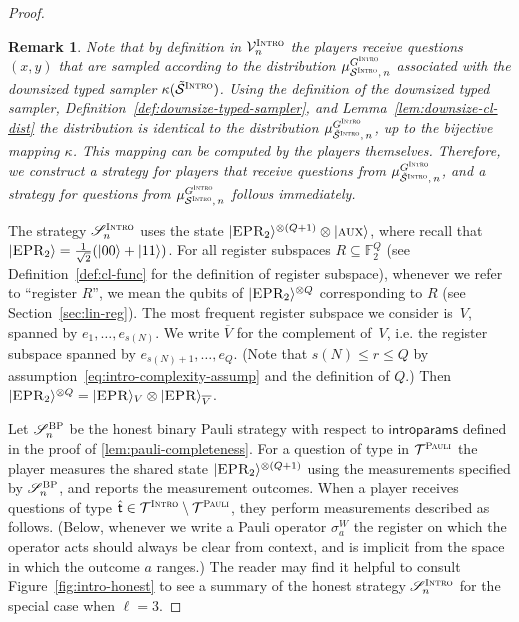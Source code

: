 \documentclass[11pt]{article}
\newtheorem{remark}[theorem]{Remark}
\theoremstyle{definition}
\newcommand{\ket}[1]{|#1\rangle}
\newcommand{\F}{\ensuremath{\mathbb{F}}}
\newcommand{\downsize}{\kappa}
\newcommand{\sampler}{\mathcal{S}}
\newcommand{\verifier}{\mathcal{V}}
\newcommand{\strategy}{\mathscr{S}}
\newcommand{\type}{\mathcal{T}}
\newcommand{\gamestyle}[1]{\ensuremath{\textsc{#1}}\xspace}
\newcommand{\pauli}{\gamestyle{Pauli}}
\newcommand{\bp}{\gamestyle{BP}}
\newcommand{\intro}{\gamestyle{Intro}}
\newcommand{\labelstyle}[1]{\ensuremath{\textsc{#1}}\xspace}
\newcommand{\EPR}{\labelstyle{EPR}}
\newcommand{\aux}{\labelstyle{aux}}
\newcommand{\tvarstyle}[1]{\mathsf{#1}}
\newcommand{\tvar}{\ensuremath{\tvarstyle{t}}}
\newcommand{\introparams}{\mathsf{introparams}}
\begin{document}
\begin{proof}
  \begin{remark}
    \label{rk:downsizing}
    Note that by definition in $\verifier_n^\intro$ the players receive
    questions $(x,y)$ that are sampled according to the distribution
    $\mu_{\sampler^\intro,\, n}^{G^\intro}$ associated with the downsized typed
    sampler $\downsize(\tilde{\sampler}^\intro)$.
    Using the definition of the downsized typed sampler,
    Definition~\ref{def:downsize-typed-sampler}, and
    Lemma~\ref{lem:downsize-cl-dist} the distribution is identical to the
    distribution $\mu_{\tilde{\sampler}^\intro,\, n}^{G^\intro}$, up to the
    bijective mapping $\downsize$.
    This mapping can be computed by the players themselves.
    Therefore, we construct a strategy for players that receive questions from
    $\mu_{\tilde{\sampler}^\intro,\, n}^{G^\intro}$, and a strategy for
    questions from $\mu_{\sampler^\intro,\, n}^{G^\intro}$ follows immediately.
  \end{remark}

  The strategy $\strategy^\intro_n$ uses the state $\ket{\EPR_2}^{\otimes (Q+1)}
  \otimes \ket{\aux}$, where recall that $\ket{\EPR_2} =
  \frac{1}{\sqrt{2}}(\ket{00}+\ket{11})$.
  For all register subspaces $R \subseteq \F_2^{Q}$ (see
  Definition~\ref{def:cl-func} for the definition of register subspace),
  whenever we refer to ``register $R$'', we mean the qubits of
  $\ket{\EPR_2}^{\otimes Q}$ corresponding to $R$ (see
  Section~\ref{sec:lin-reg}).
  The most frequent register subspace we consider is~$V$, spanned by $e_1,
  \ldots, e_{s(N)}$.
  We write $\overline{V}$ for the complement of~$V$, i.e.
  the register subspace spanned by $e_{s(N)+1}, \ldots, e_{Q}$.
  (Note that $s(N) \leq r \leq Q$ by
  assumption~\eqref{eq:intro-complexity-assump} and the definition of $Q$.)
  Then $\ket{\EPR_2}^{\otimes Q} = \ket{\EPR}_V \otimes
  \ket{\EPR}_{\overline{V}}$.

  Let $\strategy^\bp_n$ be the honest binary Pauli strategy with respect to
  $\introparams$ defined in the proof of \cref{lem:pauli-completeness}.
  For a question of type in $\type^\pauli$ the player measures the shared state
  $\ket{\EPR_2}^{\otimes (Q+1)}$ using the measurements specified by
  $\strategy^\bp_n$, and reports the measurement outcomes.
  When a player receives questions of type $\hat{\tvar} \in \type^\intro
  \setminus \type^\pauli$, they perform measurements described as follows.
  (Below, whenever we write a Pauli operator $\sigma^W_a$ the register on which
  the operator acts should always be clear from context, and is implicit from
  the space in which the outcome $a$ ranges.)
  The reader may find it helpful to consult Figure~\ref{fig:intro-honest} to see
  a summary of the honest strategy $\strategy^\intro_n$ for the special case
  when $\ell = 3$.


\end{proof}
\end{document}
